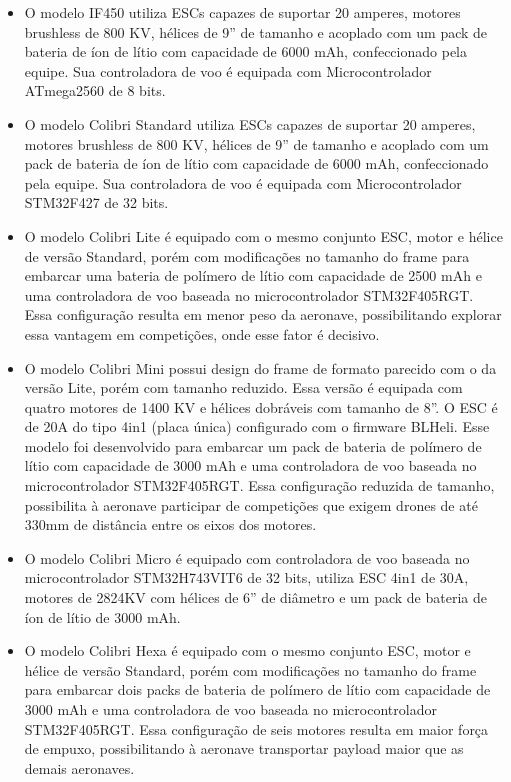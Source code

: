 \documentclass[conference]{IEEEtran}
\begin{document}
\begin{itemize}
    \item O modelo IF450 utiliza ESCs capazes de suportar 20 amperes, motores brushless de 800 KV, hélices de 9” de tamanho e acoplado com um pack de bateria de íon de lítio com capacidade de 6000 mAh, confeccionado pela equipe. Sua controladora de voo é equipada com Microcontrolador ATmega2560 de 8 bits.
    
    \item O modelo Colibri Standard utiliza ESCs capazes de suportar 20 amperes, motores brushless de 800 KV, hélices de 9” de tamanho e acoplado com um pack de bateria de íon de lítio com capacidade de 6000 mAh, confeccionado pela equipe. Sua controladora de voo é equipada com Microcontrolador STM32F427 de 32 bits. 
    
    \item O modelo Colibri Lite é equipado com o mesmo conjunto ESC, motor e hélice de versão Standard, porém com modificações no tamanho do frame para embarcar uma bateria de polímero de lítio com capacidade de 2500 mAh e uma controladora de voo baseada no microcontrolador STM32F405RGT. Essa configuração resulta em menor peso da aeronave, possibilitando explorar essa vantagem em competições, onde esse fator é decisivo.

    \item O modelo Colibri Mini possui design do frame de formato parecido com o da versão Lite, porém com tamanho reduzido. Essa versão é equipada com quatro motores de 1400 KV e hélices dobráveis com tamanho de 8”. O ESC é de 20A do tipo 4in1 (placa única) configurado com o firmware BLHeli. Esse modelo foi desenvolvido para embarcar um pack de bateria de polímero de lítio com capacidade de 3000 mAh e uma controladora de voo baseada no microcontrolador STM32F405RGT. Essa configuração reduzida de tamanho, possibilita à aeronave participar de competições que exigem drones de até 330mm de distância entre os eixos dos motores.

    \item O modelo Colibri Micro é equipado com controladora de voo baseada no microcontrolador STM32H743VIT6 de 32 bits, utiliza ESC 4in1 de 30A, motores de 2824KV com hélices de 6” de diâmetro e um pack de bateria de íon de lítio de 3000 mAh.

    \item O modelo Colibri Hexa é equipado com o mesmo conjunto ESC, motor e hélice de versão Standard, porém com modificações no tamanho do frame para embarcar dois packs de bateria de polímero de lítio com capacidade de 3000 mAh e uma controladora de voo baseada no microcontrolador STM32F405RGT. Essa configuração de seis motores resulta em maior força de empuxo, possibilitando à aeronave transportar payload maior que as demais aeronaves.

    
\end{itemize}
\end{document}
